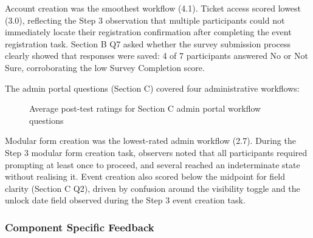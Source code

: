 \documentclass[12pt]{article}
\begin{document}
Account creation was the smoothest workflow (4.1). Ticket access scored lowest (3.0), reflecting the Step 3 observation that multiple participants could not immediately locate their registration confirmation after completing the event registration task. Section B Q7 asked whether the survey submission process clearly showed that responses were saved: 4 of 7 participants answered No or Not Sure, corroborating the low Survey Completion score.

The admin portal questions (Section C) covered four administrative workflows:

\begin{figure}[H]
\centering
{}
\caption{Average post-test ratings for Section C admin portal workflow questions}
\label{fig:admin-portal-ratings}
\end{figure}

Modular form creation was the lowest-rated admin workflow (2.7). During the Step 3 modular form creation task, observers noted that all participants required prompting at least once to proceed, and several reached an indeterminate state without realising it. Event creation also scored below the midpoint for field clarity (Section C Q2), driven by confusion around the visibility toggle and the unlock date field observed during the Step 3 event creation task.

\subsubsection{Component Specific Feedback}
\end{document}
